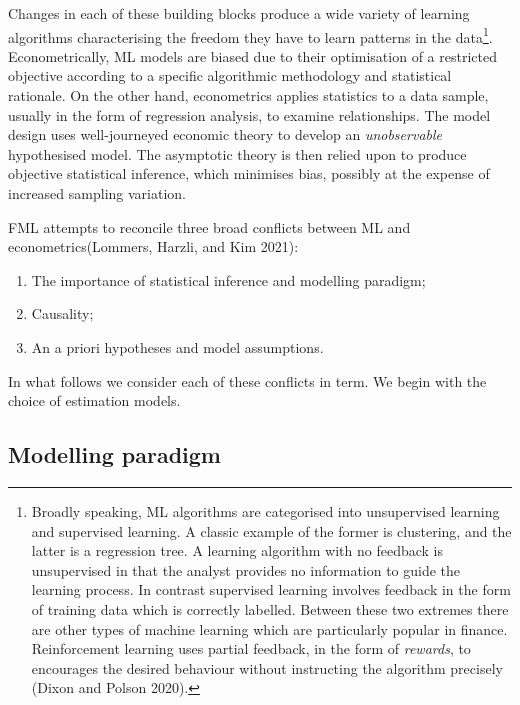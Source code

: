 \documentclass{article}
\begin{document}
Changes in each of these building blocks produce a wide variety of
learning algorithms characterising the freedom they have to learn
patterns in the data\footnote{Broadly speaking, ML algorithms are
  categorised into unsupervised learning and supervised learning. A
  classic example of the former is clustering, and the latter is a
  regression tree. A learning algorithm with no feedback is unsupervised
  in that the analyst provides no information to guide the learning
  process. In contrast supervised learning involves feedback in the form
  of training data which is correctly labelled. Between these two
  extremes there are other types of machine learning which are
  particularly popular in finance. Reinforcement learning uses partial
  feedback, in the form of \emph{rewards}, to encourages the desired
  behaviour without instructing the algorithm precisely (Dixon and
  Polson 2020).}. Econometrically, ML models are biased due to their
optimisation of a restricted objective according to a specific
algorithmic methodology and statistical rationale. On the other hand,
econometrics applies statistics to a data sample, usually in the form of
regression analysis, to examine relationships. The model design uses
well-journeyed economic theory to develop an \emph{unobservable}
hypothesised model. The asymptotic theory is then relied upon to produce
objective statistical inference, which minimises bias, possibly at the
expense of increased sampling variation.

FML attempts to reconcile three broad conflicts between ML and
econometrics(Lommers, Harzli, and Kim 2021):

\begin{enumerate}
\def\labelenumi{\arabic{enumi}.}
\tightlist
\item
  The importance of statistical inference and modelling paradigm;
\item
  Causality;
\item
  An a priori hypotheses and model assumptions.
\end{enumerate}

In what follows we consider each of these conflicts in term. We begin
with the choice of estimation models.

\hypertarget{modelling-paradigm}{%
\subsection{Modelling paradigm}\label{modelling-paradigm}}
\end{document}

